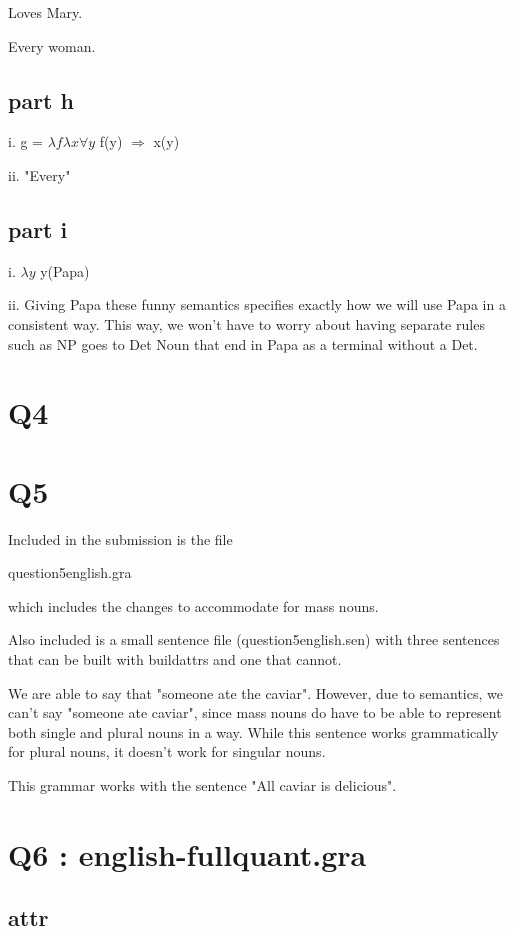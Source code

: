 \documentclass[12pt, letterpaper]{article}
\begin{document}
Loves Mary.

Every woman.

\subsection{part h}

i. g = $\lambda f \lambda x \forall y$ f(y) $\Rightarrow$ x(y)

ii. "Every"

\subsection{part i}

i. $\lambda y$ y(Papa)

ii. Giving Papa these funny semantics specifies exactly how we will use Papa in a consistent way. This way, we won't have to worry about having separate rules such as NP goes to Det Noun that end in Papa as a terminal without a Det.

\section{Q4}

\section{Q5}
Included in the submission is the file

question5english.gra

which includes the changes to accommodate for mass nouns.

Also included is a small sentence file (question5english.sen) with three sentences that can be built with buildattrs and one that cannot. 

We are able to say that "someone ate the caviar". However, due to semantics, we can't say "someone ate caviar", since mass nouns do have to be able to represent both single and plural nouns in a way. While this sentence works grammatically for plural nouns, it doesn't work for singular nouns. 

This grammar works with the sentence "All caviar is delicious".

\section{Q6 : english-fullquant.gra}
\subsection{attr}
\end{document}
